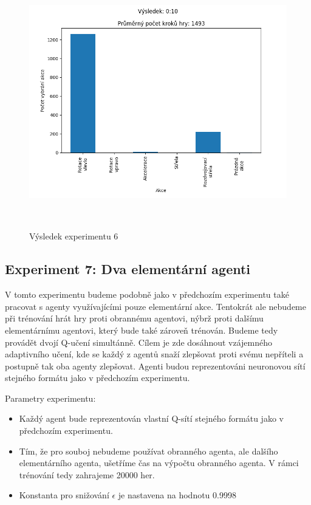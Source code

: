 \begin{figure}[H]\centering
\includegraphics[width=145mm, height=110mm]{./Obrazky/Experiment06Results.png}
\caption{Výsledek experimentu 6}
\label{Výsledek experimentu 06}
\end{figure}
    



\subsection{Experiment 7: Dva elementární agenti}
V tomto experimentu budeme podobně jako v předchozím experimentu také pracovat s agenty využívajícími pouze elementární akce.
Tentokrát ale nebudeme při trénování hrát hry proti obrannému agentovi, nýbrž proti dalšímu elementárnímu agentovi, který bude také zároveň trénován.
Budeme tedy provádět dvojí Q-učení simultánně. Cílem je zde dosáhnout vzájemného adaptivního učení, kde se každý z agentů snaží zlepšovat proti svému nepříteli a postupně tak oba agenty zlepšovat.
Agenti budou reprezentováni neuronovou sítí stejného formátu jako v předchozím experimentu.

\par


Parametry experimentu:
\begin{itemize}
    \item Každý agent bude reprezentován vlastní Q-sítí stejného formátu jako v předchozím experimentu.
    \item Tím, že pro souboj nebudeme používat obranného agenta, ale dalšího elementárního agenta, ušetříme čas na výpočtu obranného agenta. V rámci trénování tedy zahrajeme 20000 her.  
    \item Konstanta pro snižování $\epsilon$ je nastavena na hodnotu 0.9998
\end{itemize}


